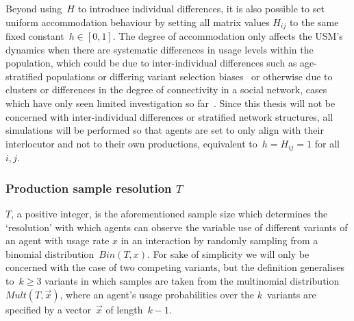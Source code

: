 Beyond using~$H$ to introduce individual differences, it is also possible to set uniform accommodation behaviour by setting all matrix values $H_{ij}$ to the same fixed constant~$h\in[0,1]$. The degree of accommodation only affects the USM's dynamics when there are systematic differences in usage levels within the population, which could be due to inter-individual differences such as age-stratified populations or differing variant selection biases~\citep{Baxter2016} or otherwise due to clusters or differences in the degree of connectivity in a social network, cases which have only seen limited investigation so far~\citep{Blythe2007divided,Michaud2017}.
Since this thesis will not be concerned with inter-individual differences or stratified network structures, all simulations will be performed so that agents are set to only align with their interlocutor and not to their own productions, equivalent to~$h=H_{ij}=1$ for all~$i,j$.

\subsubsection{Production sample resolution $T$}

$T$, a positive integer, is the aforementioned sample size which determines the `resolution' with which agents can observe the variable use of different variants of an agent with usage rate $x$ in an interaction by randomly sampling from a binomial distribution~$Bin(T,x)$. For sake of simplicity we will only be concerned with the case of two competing variants, but the definition generalises to~$k\ge3$ variants in which samples are taken from the multinomial distribution~$Mult(T,\vec{x})$, where an agent's usage probabilities over the $k$~variants are specified by a vector~$\vec{x}$ of length~$k-1$.

